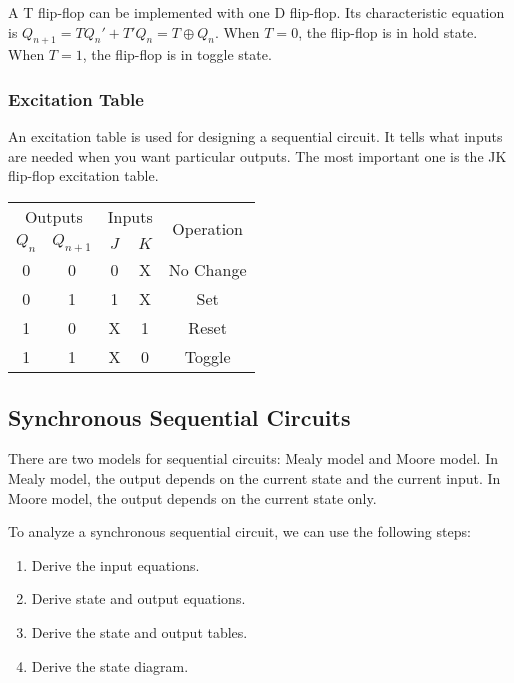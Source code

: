 \documentclass[a4paper,12pt]{article}
\begin{document}
A T flip-flop can be implemented with one D flip-flop.
Its characteristic equation is $Q_{n+1} = TQ_n' + T'Q_n = T \oplus Q_n$.
When $T = 0$, the flip-flop is in hold state.
When $T = 1$, the flip-flop is in toggle state.

\subsubsection{Excitation Table}

An excitation table is used for designing a sequential circuit.
It tells what inputs are needed when you want particular outputs.
The most important one is the JK flip-flop excitation table.
\begin{center}
	\begin{tabular}{ccccc}
		\toprule
		\multicolumn{2}{c}{Outputs} & \multicolumn{2}{c}{Inputs} & \multirow{2}{*}{Operation} \\
		\cmidrule(lr){1-2} \cmidrule(lr){3-4}
		$Q_n$ & $Q_{n+1}$ & $J$ & $K$ & \\
		\midrule
		0 & 0 & 0 & X & No Change \\
		0 & 1 & 1 & X & Set \\
		1 & 0 & X & 1 & Reset \\
		1 & 1 & X & 0 & Toggle \\
		\bottomrule
	\end{tabular}
\end{center}

\subsection{Synchronous Sequential Circuits}

There are two models for sequential circuits: Mealy model and Moore model.
In Mealy model, the output depends on the current state and the current input.
In Moore model, the output depends on the current state only.

To analyze a synchronous sequential circuit, we can use the following steps:
\begin{enumerate}
	\item Derive the input equations.
	\item Derive state and output equations.
	\item Derive the state and output tables.
	\item Derive the state diagram.
\end{enumerate}
\end{document}
